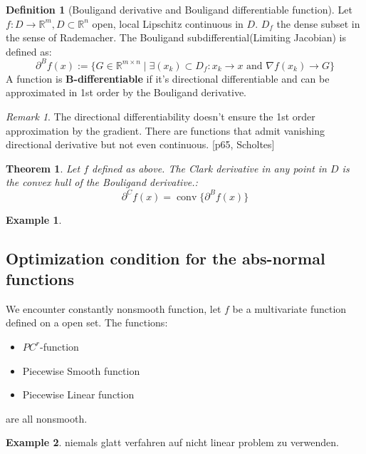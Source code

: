 \documentclass[a4paper,11pt,fleqn, draft]{book}
\newtheorem{theorem}{Theorem}[section]
\theoremstyle{definition}
\newtheorem{definition}{Definition}[section]
\newtheorem*{example}{Example}
\theoremstyle{remark}
\newtheorem*{remark}{Remark}
\DeclareMathOperator*{\conv}{conv}
\begin{document}
\begin{definition}[Bouligand derivative and Bouligand differentiable function]
Let $f: D \longrightarrow \mathbb{R}^m, D \subset \mathbb{R}^n$ open, local Lipschitz continuous in $D$. $D_f$ the dense subset in the sense of Rademacher. The Bouligand subdifferential(Limiting Jacobian) is defined as:
	\begin{equation*}
		\partial^B f(x) := \{ G \in \mathbb{R}^{m \times n} \mid \exists (x_k) \subset D_f: x_k \rightarrow x \text{ and } \nabla f(x_k) \rightarrow G \}
	\end{equation*} 
	A function is \textbf{B-differentiable} if it's directional differentiable and can be approximated in 1st order by the Bouligand derivative. 
\end{definition}
\begin{remark}
The directional differentiability doesn't ensure the 1st order approximation by the gradient. There are functions that admit vanishing directional derivative but not even continuous. [p65, Scholtes]	
\end{remark}


\begin{theorem}
	Let $f$ defined as above. The Clark derivative in any point in $D$ is the convex hull of the Bouligand derivative.:
	\begin{equation*}
		\partial^C f(x) = \conv\{ \partial^B f(x) \}
	\end{equation*}
\end{theorem}

\begin{example}
\end{example}

\subsection{Optimization condition for the abs-normal functions}
We encounter constantly nonsmooth function, let $f$ be a multivariate function defined on a open set. The functions:
	\begin{itemize}
	\item $PC^r$-function
	\item Piecewise Smooth function
	\item Piecewise Linear function
\end{itemize} 
are all nonsmooth. 


\begin{example}
	niemals glatt verfahren auf nicht linear problem zu verwenden. 
\end{example}
\end{document}
